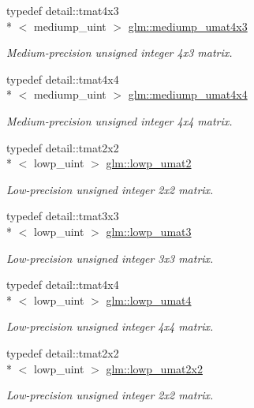 \begin{DoxyCompactItemize}
typedef detail\-::tmat4x3\\*
$<$ mediump\-\_\-uint $>$ \hyperlink{group__gtc__matrix__integer_gadf09c66253321ec625819792cacd5fc6}{glm\-::mediump\-\_\-umat4x3}
\begin{DoxyCompactList}\small\item\em Medium-\/precision unsigned integer 4x3 matrix. \end{DoxyCompactList}\item 
typedef detail\-::tmat4x4\\*
$<$ mediump\-\_\-uint $>$ \hyperlink{group__gtc__matrix__integer_ga27a135717a6c01fc900a8f10862718ac}{glm\-::mediump\-\_\-umat4x4}
\begin{DoxyCompactList}\small\item\em Medium-\/precision unsigned integer 4x4 matrix. \end{DoxyCompactList}\item 
typedef detail\-::tmat2x2\\*
$<$ lowp\-\_\-uint $>$ \hyperlink{group__gtc__matrix__integer_ga8af5e120231c533b017123546642ef18}{glm\-::lowp\-\_\-umat2}
\begin{DoxyCompactList}\small\item\em Low-\/precision unsigned integer 2x2 matrix. \end{DoxyCompactList}\item 
typedef detail\-::tmat3x3\\*
$<$ lowp\-\_\-uint $>$ \hyperlink{group__gtc__matrix__integer_ga9a4fea23f614c09bd4f69300849e53b8}{glm\-::lowp\-\_\-umat3}
\begin{DoxyCompactList}\small\item\em Low-\/precision unsigned integer 3x3 matrix. \end{DoxyCompactList}\item 
typedef detail\-::tmat4x4\\*
$<$ lowp\-\_\-uint $>$ \hyperlink{group__gtc__matrix__integer_ga8c3fe5b40073668893a32bd07b7a64a1}{glm\-::lowp\-\_\-umat4}
\begin{DoxyCompactList}\small\item\em Low-\/precision unsigned integer 4x4 matrix. \end{DoxyCompactList}\item 
typedef detail\-::tmat2x2\\*
$<$ lowp\-\_\-uint $>$ \hyperlink{group__gtc__matrix__integer_ga2159eb0e37b35ff0ea9a2c909bafaa72}{glm\-::lowp\-\_\-umat2x2}
\begin{DoxyCompactList}\small\item\em Low-\/precision unsigned integer 2x2 matrix. \end{DoxyCompactList}\item 

\end{DoxyCompactItemize}
